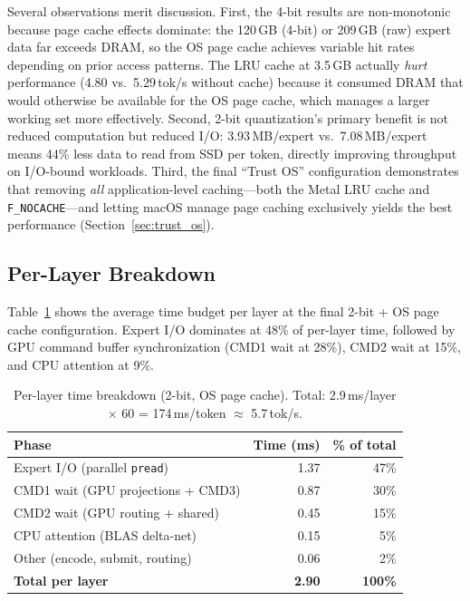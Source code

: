 \documentclass[11pt,twocolumn]{article}
\begin{document}
Several observations merit discussion.
First, the 4-bit results are non-monotonic because page cache effects dominate: the 120\,GB (4-bit) or 209\,GB (raw) expert data far exceeds DRAM, so the OS page cache achieves variable hit rates depending on prior access patterns.
The LRU cache at 3.5\,GB actually \emph{hurt} performance (4.80 vs.\ 5.29\,tok/s without cache) because it consumed DRAM that would otherwise be available for the OS page cache, which manages a larger working set more effectively.
Second, 2-bit quantization's primary benefit is not reduced computation but reduced I/O: 3.93\,MB/expert vs.\ 7.08\,MB/expert means 44\% less data to read from SSD per token, directly improving throughput on I/O-bound workloads.
Third, the final ``Trust OS'' configuration demonstrates that removing \emph{all} application-level caching---both the Metal LRU cache and \texttt{F\_NOCACHE}---and letting macOS manage page caching exclusively yields the best performance (Section~\ref{sec:trust_os}).

\subsection{Per-Layer Breakdown}

Table~\ref{tab:breakdown} shows the average time budget per layer at the final 2-bit + OS page cache configuration.
Expert I/O dominates at 48\% of per-layer time, followed by GPU command buffer synchronization (CMD1 wait at 28\%), CMD2 wait at 15\%, and CPU attention at 9\%.

\begin{table}[t]
\centering
\caption{Per-layer time breakdown (2-bit, OS page cache). Total: 2.9\,ms/layer $\times$ 60 = 174\,ms/token $\approx$ 5.7\,tok/s.}
\label{tab:breakdown}
\begin{tabular}{lrr}
\toprule
\textbf{Phase} & \textbf{Time (ms)} & \textbf{\% of total} \\
\midrule
Expert I/O (parallel \texttt{pread}) & 1.37 & 47\% \\
CMD1 wait (GPU projections + CMD3) & 0.87 & 30\% \\
CMD2 wait (GPU routing + shared) & 0.45 & 15\% \\
CPU attention (BLAS delta-net) & 0.15 & 5\% \\
Other (encode, submit, routing) & 0.06 & 2\% \\
\midrule
\textbf{Total per layer} & \textbf{2.90} & \textbf{100\%} \\
\bottomrule
\end{tabular}
\end{table}
\end{document}

